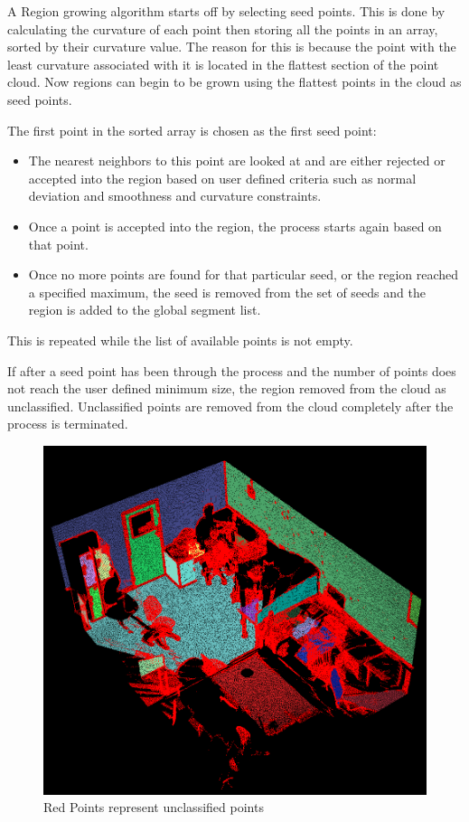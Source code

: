 		A Region growing algorithm starts off by selecting seed points. This is done by calculating the curvature of each point then storing all the points in an array, sorted by their curvature value. The reason for this is because the point with the least curvature associated with it is located in the flattest section of the point cloud. Now regions can begin to be grown using the flattest points in the cloud as seed points. 
		
		The first point in the sorted array is chosen as the first seed point:
		
		\begin{itemize}
			
			\item The nearest neighbors to this point are looked at and are either rejected or accepted into the region based on user defined criteria such as normal deviation and smoothness and curvature constraints.
			
			\item Once a point is accepted into the region, the process starts again based on that point.
			
			\item Once no more points are found for that particular seed, or the region reached a specified maximum, the seed is removed from the set of seeds and the region is added to the global segment list. 
			
		\end{itemize}
		
		This is repeated while the list of available points is not empty.
		
		If after a seed point has been through the process and the number of points does not reach the user defined minimum size, the region removed from the cloud as unclassified. Unclassified points are removed from the cloud completely after the process is terminated.
		
		\begin{figure}[H]
			\centering
			\includegraphics[width=0.6\linewidth]{Includes/images/GrownRegions}
			\caption{Red Points represent unclassified points}
			\label{fig:GrownRegions}
		\end{figure}
		
